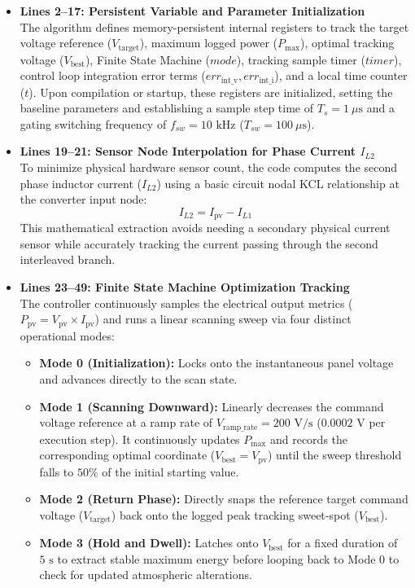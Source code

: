 \begin{itemize}
    \item \textbf{Lines 2--17: Persistent Variable and Parameter Initialization} \\
    The algorithm defines memory-persistent internal registers to track the target voltage reference ($V_{\text{target}}$), maximum logged power ($P_{\text{max}}$), optimal tracking voltage ($V_{\text{best}}$), Finite State Machine ($mode$), tracking sample timer ($timer$), control loop integration error terms ($err_{\text{int\_v}}, err_{\text{int\_i}}$), and a local time counter ($t$). Upon compilation or startup, these registers are initialized, setting the baseline parameters and establishing a sample step time of $T_s = 1\ \mu\text{s}$ and a gating switching frequency of $f_{sw} = 10\text{ kHz}$ ($T_{sw} = 100\ \mu\text{s}$).
\newpage
    \item \textbf{Lines 19--21: Sensor Node Interpolation for Phase Current $I_{L2}$} \\
    To minimize physical hardware sensor count, the code computes the second phase inductor current ($I_{L2}$) using a basic circuit nodal KCL relationship at the converter input node:
    \begin{equation}
        I_{L2} = I_{\text{pv}} - I_{L1}
    \end{equation}
    This mathematical extraction avoids needing a secondary physical current sensor while accurately tracking the current passing through the second interleaved branch.

    \item \textbf{Lines 23--49: Finite State Machine Optimization Tracking} \\
    The controller continuously samples the electrical output metrics ($P_{\text{pv}} = V_{\text{pv}} \times I_{\text{pv}}$) and runs a linear scanning sweep via four distinct operational modes:
    \begin{itemize}
        \item \textbf{Mode 0 (Initialization):} Locks onto the instantaneous panel voltage and advances directly to the scan state.
        \item \textbf{Mode 1 (Scanning Downward):} Linearly decreases the command voltage reference at a ramp rate of $V_{\text{ramp\_rate}} = 200\text{ V/s}$ ($0.0002\text{ V}$ per execution step). It continuously updates $P_{\text{max}}$ and records the corresponding optimal coordinate ($V_{\text{best}} = V_{\text{pv}}$) until the sweep threshold falls to $50\%$ of the initial starting value.
        \item \textbf{Mode 2 (Return Phase):} Directly snaps the reference target command voltage ($V_{\text{target}}$) back onto the logged peak tracking sweet-spot ($V_{\text{best}}$).
        \item \textbf{Mode 3 (Hold and Dwell):} Latches onto $V_{\text{best}}$ for a fixed duration of $5\text{ s}$ to extract stable maximum energy before looping back to Mode 0 to check for updated atmospheric alterations.
    \end{itemize}


\end{itemize}
